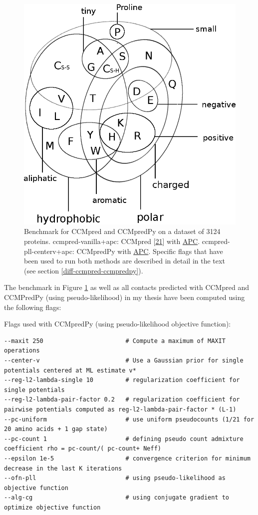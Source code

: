 \documentclass[12pt,a4paper,twoside]{book}
\theoremstyle{definition}
\theoremstyle{definition}
\theoremstyle{remark}
\begin{document}
\begin{figure}
\includegraphics[width=1\linewidth]{img/amino_acid_physico_chemical_properties_venn_diagramm} \caption{Benchmark for CCMpred and
CCMpredPy on a dataset of 3124 proteins. ccmpred-vanilla+apc: CCMpred
{[}\protect\hyperlink{ref-Seemayer2014}{21}{]} with
\protect\hyperlink{abbrev}{APC}. ccmpred-pll-centerv+apc: CCMpredPy with
\protect\hyperlink{abbrev}{APC}. Specific flags that have been used to
run both methods are described in detail in the text (see section
\ref{diff-ccmpred-ccmpredpy}).}\label{fig:cmmpredvanilla-vs-ccmpredpy}
\end{figure}

The benchmark in Figure \ref{fig:cmmpredvanilla-vs-ccmpredpy} as well as
all contacts predicted with CCMpred and CCMPredPy (using
pseudo-likelihood) in my thesis have been computed using the following
flags:

Flags used with CCMpredPy (using pseudo-likelihood objective function):

\begin{verbatim}
--maxit 250                       # Compute a maximum of MAXIT operations
--center-v                        # Use a Gaussian prior for single potentials centered at ML estimate v*
--reg-l2-lambda-single 10         # regularization coefficient for single potentials
--reg-l2-lambda-pair-factor 0.2   # regularization coefficient for pairwise potentials computed as reg-l2-lambda-pair-factor * (L-1)
--pc-uniform                      # use uniform pseudocounts (1/21 for 20 amino acids + 1 gap state) 
--pc-count 1                      # defining pseudo count admixture coefficient rho = pc-count/( pc-count+ Neff)
--epsilon 1e-5                    # convergence criterion for minimum decrease in the last K iterations
--ofn-pll                         # using pseudo-likelihood as objective function
--alg-cg                          # using conjugate gradient to optimize objective function
\end{verbatim}
\end{document}
